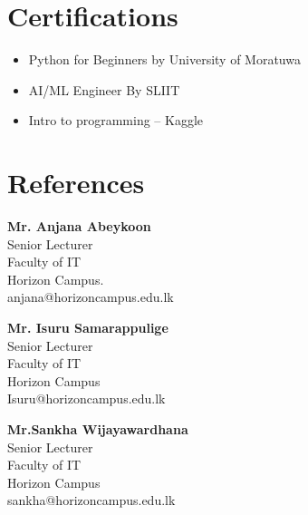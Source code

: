 \documentclass[10pt,a4paper]{article}
\begin{document}
\section{Certifications}
 \begin{itemize}
  \item Python for Beginners by University of Moratuwa
  \item AI/ML Engineer By SLIIT
  \item Intro to programming -- Kaggle
 \end{itemize}

\section{References}
\begin{minipage}[t]{0.3\textwidth}
\textbf{Mr. Anjana Abeykoon} \\
Senior Lecturer \\
Faculty of IT \\
Horizon Campus. \\
anjana@horizoncampus.edu.lk
\end{minipage}
\hfill
\begin{minipage}[t]{0.3\textwidth}
  \textbf{Mr. Isuru Samarappulige} \\
  Senior Lecturer \\
  Faculty of IT \\
  Horizon Campus \\
  Isuru@horizoncampus.edu.lk \\
\end{minipage}
\hfill
\begin{minipage}[t]{0.3\textwidth}
  \textbf{Mr.Sankha Wijayawardhana} \\
  Senior Lecturer \\
  Faculty of IT \\
  Horizon Campus \\
  sankha@horizoncampus.edu.lk
\end{minipage}
\end{document}
